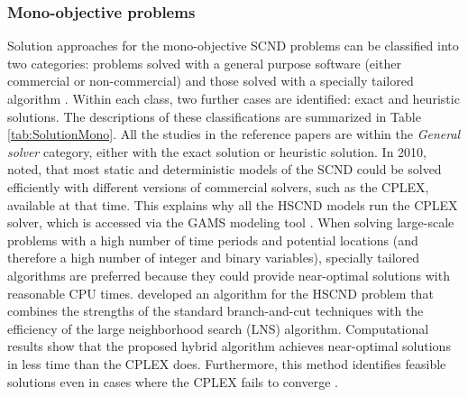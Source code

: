 \documentclass[11pt,3p]{elsarticle}
\begin{document}
\subsubsection{Mono-objective problems}

Solution approaches for the mono-objective SCND problems can be classified into two categories: problems solved with a general purpose software (either commercial or non-commercial) and those solved with a specially tailored algorithm \citep{melo2009facility}. Within each class, two further cases are identified: exact and heuristic solutions. The descriptions of these classifications are summarized in Table \ref{tab:SolutionMono}. All the studies in the reference papers are within the \textit{General solver} category, either with the exact solution or heuristic solution. In 2010, \citet{klibi2010design} noted, that most static and deterministic models of the SCND could be solved efficiently with different versions of commercial solvers, such as the CPLEX, available at that time. This explains why all the HSCND models run the CPLEX solver, which is accessed via the GAMS modeling tool \citep{rosenthal2014gams}. When solving large-scale problems with a high number of time periods and potential locations (and therefore a high number of integer and binary variables), specially tailored algorithms are preferred because they could provide near-optimal solutions with reasonable CPU times. \citet{copado2013large} developed an algorithm for the HSCND problem that combines the strengths of the standard branch-and-cut techniques with the efficiency of the large neighborhood search (LNS) algorithm. Computational results show that the proposed hybrid algorithm achieves near-optimal solutions in less time than the CPLEX does. Furthermore, this method identifies feasible solutions even in cases where the CPLEX fails to converge \citep{copado2013large}.
\end{document}

